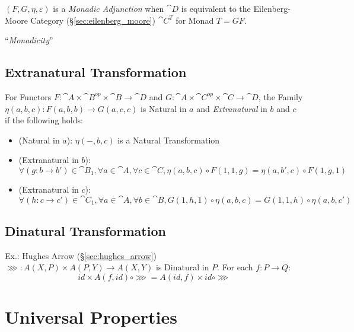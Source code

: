 $(F,G,\eta,\varepsilon)$ is a \emph{Monadic Adjunction} when
$\cat{D}$ is equivalent to the Eilenberg-Moore Category
(\S\ref{sec:eilenberg_moore}) $\cat{C}^T$ for Monad $T = GF$.

``\emph{Monadicity}''



\subsection{Extranatural Transformation}
\label{sec:extranatural_transformation}

For Functors $F : \cat{A} \times \cat{B}^{op} \times \cat{B}
\rightarrow \cat{D}$ and $G : \cat{A} \times \cat{C}^{op} \times
\cat{C} \rightarrow \cat{D}$, the Family $\eta(a,b,c) : F(a,b,b)
\rightarrow G(a,c,c)$ is Natural in $a$ and \emph{Extranatural} in $b$
and $c$ if the following holds:
\begin{itemize}
  \item (Natural in $a$): $\eta (-,b,c)$ is a Natural Transformation
  \item (Extranatural in $b$): $\forall (g:b \rightarrow b') \in
    \cat{B}_1, \forall a \in \cat{A}, \forall c \in \cat{C},
    \eta(a,b,c) \circ F(1,1,g) = \eta(a,b',c) \circ F(1,g,1)$
  \item (Extranatural in $c$): $\forall (h:c \rightarrow c') \in
    \cat{C}_1, \forall a \in \cat{A}, \forall b \in \cat{B}, G(1,h,1)
    \circ \eta(a,b,c) = G(1,1,h) \circ \eta(a,b,c')$
\end{itemize}



\subsection{Dinatural Transformation}
\label{sec:dinatural_transformation}

Ex.: Hughes Arrow (\S\ref{sec:hughes_arrow}) $\ggg : A (X,P) \times A
(P,Y) \rightarrow A (X,Y)$ is Dinatural in $P$. For each $f : P
\rightarrow Q$:
\[
  id \times A(f,id) \circ \ggg = A(id,f) \times id \circ \ggg
\]



\section{Universal Properties}\label{sec:universal_property}

